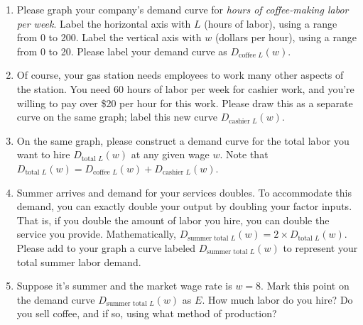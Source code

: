 \documentclass[
    letterpaper,paper=portrait,fleqn,
    DIV=16,fontsize=12pt,twoside=semi,
    parskip=full-,
    headings=standardclasses]
{scrartcl}
\begin{document}
\begin{enumerate}

\item Please graph your company's demand curve for \emph{hours of coffee-making labor per week}. Label the horizontal axis with $L$ (hours of labor), using a range from 0 to 200. Label the vertical axis with $w$ (dollars per hour), using a range from 0 to 20. Please label your demand curve as $D_{\text{coffee }L}(w)$.

\begin{center}
\end{center}

\clearpage

\item Of course, your gas station needs employees to work many other aspects of the station. You need 60 hours of labor per week for cashier work, and you're willing to pay over \$20 per hour for this work. Please draw this as a separate curve on the same graph; label this new curve $D_{\text{cashier }L}(w)$.

\item On the same graph, please construct a demand curve for the total labor you want to hire $D_{\text{total }L}(w)$ at any given wage $w$. Note that $D_{\text{total }L}(w) = D_{\text{coffee }L}(w) + D_{\text{cashier }L}(w)$.

\item Summer arrives and demand for your services doubles. To accommodate this demand, you can exactly double your output by doubling your factor inputs. That is, if you double the amount of labor you hire, you can double the service you provide. Mathematically, $D_{\text{summer total }L}(w)=2 \times D_{\text{total }L}(w)$. Please add to your graph a curve labeled $D_{\text{summer total }L}(w)$ to represent your total summer labor demand.

\item Suppose it's summer and the market wage rate is $w=8$. Mark this point on the demand curve $D_{\text{summer total }L}(w)$ as $E$. How much labor do you hire? Do you sell coffee, and if so, using what method of production?


\end{enumerate}
\end{document}
